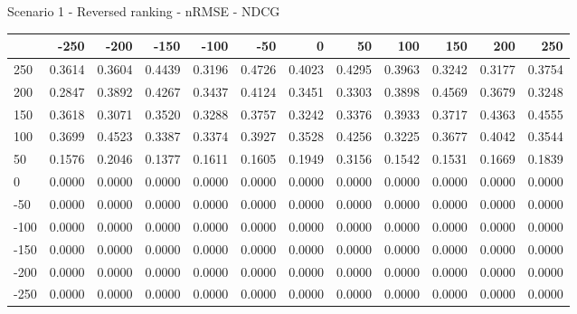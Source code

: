 Scenario 1 - Reversed ranking - nRMSE - NDCG
\begin{tabular}{lrrrrrrrrrrr}
\toprule
{} &   -250 &   -200 &   -150 &   -100 &   -50  &    0   &    50  &    100 &    150 &    200 &    250 \\
\midrule
 250 & 0.3614 & 0.3604 & 0.4439 & 0.3196 & 0.4726 & 0.4023 & 0.4295 & 0.3963 & 0.3242 & 0.3177 & 0.3754 \\
 200 & 0.2847 & 0.3892 & 0.4267 & 0.3437 & 0.4124 & 0.3451 & 0.3303 & 0.3898 & 0.4569 & 0.3679 & 0.3248 \\
 150 & 0.3618 & 0.3071 & 0.3520 & 0.3288 & 0.3757 & 0.3242 & 0.3376 & 0.3933 & 0.3717 & 0.4363 & 0.4555 \\
 100 & 0.3699 & 0.4523 & 0.3387 & 0.3374 & 0.3927 & 0.3528 & 0.4256 & 0.3225 & 0.3677 & 0.4042 & 0.3544 \\
 50  & 0.1576 & 0.2046 & 0.1377 & 0.1611 & 0.1605 & 0.1949 & 0.3156 & 0.1542 & 0.1531 & 0.1669 & 0.1839 \\
 0   & 0.0000 & 0.0000 & 0.0000 & 0.0000 & 0.0000 & 0.0000 & 0.0000 & 0.0000 & 0.0000 & 0.0000 & 0.0000 \\
-50  & 0.0000 & 0.0000 & 0.0000 & 0.0000 & 0.0000 & 0.0000 & 0.0000 & 0.0000 & 0.0000 & 0.0000 & 0.0000 \\
-100 & 0.0000 & 0.0000 & 0.0000 & 0.0000 & 0.0000 & 0.0000 & 0.0000 & 0.0000 & 0.0000 & 0.0000 & 0.0000 \\
-150 & 0.0000 & 0.0000 & 0.0000 & 0.0000 & 0.0000 & 0.0000 & 0.0000 & 0.0000 & 0.0000 & 0.0000 & 0.0000 \\
-200 & 0.0000 & 0.0000 & 0.0000 & 0.0000 & 0.0000 & 0.0000 & 0.0000 & 0.0000 & 0.0000 & 0.0000 & 0.0000 \\
-250 & 0.0000 & 0.0000 & 0.0000 & 0.0000 & 0.0000 & 0.0000 & 0.0000 & 0.0000 & 0.0000 & 0.0000 & 0.0000 \\
\bottomrule
\end{tabular}

